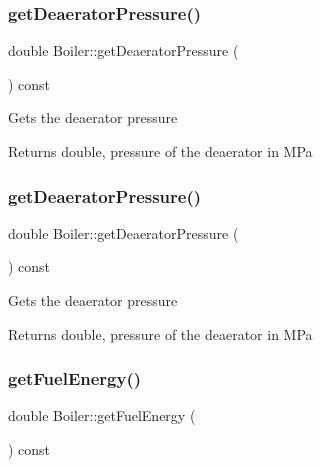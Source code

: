 \subsubsection{\texorpdfstring{get\+Deaerator\+Pressure()}{getDeaeratorPressure()}\hspace{0.1cm}{\footnotesize\ttfamily [2/3]}}
{\footnotesize\ttfamily double Boiler\+::get\+Deaerator\+Pressure (\begin{DoxyParamCaption}{ }\end{DoxyParamCaption}) const}

Gets the deaerator pressure \begin{DoxyReturn}{Returns}
double, pressure of the deaerator in M\+Pa 
\end{DoxyReturn}
\mbox{\label{class_boiler_aad4786e7b68084e65a35dd6235517b8c}} 
\subsubsection{\texorpdfstring{get\+Deaerator\+Pressure()}{getDeaeratorPressure()}\hspace{0.1cm}{\footnotesize\ttfamily [3/3]}}
{\footnotesize\ttfamily double Boiler\+::get\+Deaerator\+Pressure (\begin{DoxyParamCaption}{ }\end{DoxyParamCaption}) const}

Gets the deaerator pressure \begin{DoxyReturn}{Returns}
double, pressure of the deaerator in M\+Pa 
\end{DoxyReturn}
\mbox{\label{class_boiler_a55542a761669c842163b20932f9747d3}} 
\subsubsection{\texorpdfstring{get\+Fuel\+Energy()}{getFuelEnergy()}\hspace{0.1cm}{\footnotesize\ttfamily [1/3]}}
{\footnotesize\ttfamily double Boiler\+::get\+Fuel\+Energy (\begin{DoxyParamCaption}{ }\end{DoxyParamCaption}) const\hspace{0.3cm}{\ttfamily [inline]}}

